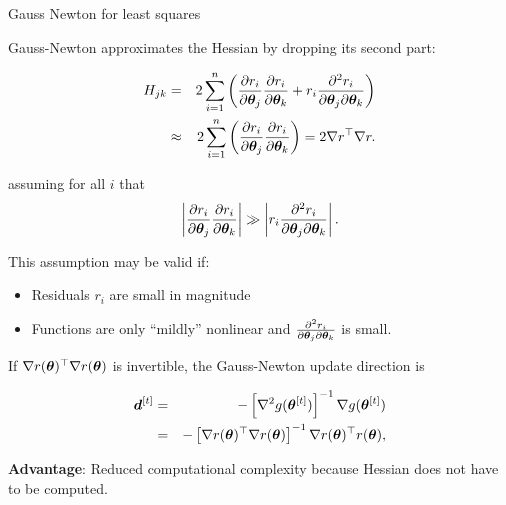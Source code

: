 \documentclass[11pt,compress,t,notes=noshow, xcolor=table]{beamer}
\begin{document}
\begin{vbframe}{Gauss Newton for least squares}

Gauss-Newton approximates the Hessian by dropping its second part:

\begin{eqnarray*}
H_{jk} &=& 2 \sum\limits_{i=1}^n \left(\frac{\partial r_i}{\partial \bm{\theta}_j}\frac{\partial r_i}{\partial \bm{\theta}_k} + r_i \frac{\partial^2 r_i}{\partial \bm{\theta}_j \partial \bm{\theta}_k}\right) \\
&\approx&  2 \sum\limits_{i=1}^n \left(\frac{\partial r_i}{\partial \bm{\theta}_j}\frac{\partial r_i}{\partial \bm{\theta}_k}\right) = 2 \nabla r^\top \nabla r.  
\end{eqnarray*}

assuming for all $i$ that 
$$
	 \left|\frac{\partial r_i}{\partial \bm{\theta}_j}\frac{\partial r_i}{\partial \bm{\theta}_k}\right| \gg \left|r_i \frac{\partial^2 r_i}{\partial \bm{\theta}_j \partial \bm{\theta}_k}\right|.
$$

This assumption may be valid if: 

\begin{itemize}
	\item Residuals $r_i$ are small in magnitude
	\item Functions are only \enquote{mildly} nonlinear and $\frac{\partial^2 r_i}{\partial \bm{\theta}_j \partial \bm{\theta}_k}$ is small. 
\end{itemize}

\framebreak 

If $\nabla r(\bm{\theta})^\top \nabla r(\bm{\theta})$ is invertible, the Gauss-Newton update direction is 

\begin{eqnarray*}
\bm{d}^{[t]} &=& - \left[\nabla^2 g(\bm{\theta}^{[t]})\right]^{-1} \nabla g(\bm{\theta}^{[t]}) \\
&=& - \left[\nabla r(\bm{\theta})^\top \nabla r(\bm{\theta})\right]^{-1} \nabla r(\bm{\theta})^\top r(\bm{\theta}),
\end{eqnarray*}

\lz

\textbf{Advantage}: Reduced computational complexity because Hessian does not have to be computed. 




\end{vbframe}
\end{document}
